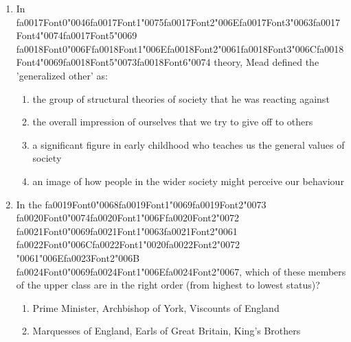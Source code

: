 \documentclass[12pt]{article}
\begin{document}
\begin{enumerate}[label=\arabic*.]
\begin{enumerate}[label=(\alph*)]
    \item an awareness of risks and dangers that affect the environment as a whole
    \item a unit with a division of labour that extends across ethnic and cultural groups
\end{enumerate}
\item In {\csname fa0017Font0\endcsname\char"0046}{\csname fa0017Font1\endcsname\char"0075}{\csname fa0017Font2\endcsname\char"006E}{\csname fa0017Font3\endcsname\char"0063}{\csname fa0017Font4\endcsname\char"0074}{\csname fa0017Font5\endcsname\char"0069} {\csname fa0018Font0\endcsname\char"006F}{\csname fa0018Font1\endcsname\char"006E}{\csname fa0018Font2\endcsname\char"0061}{\csname fa0018Font3\endcsname\char"006C}{\csname fa0018Font4\endcsname\char"0069}{\csname fa0018Font5\endcsname\char"0073}{\csname fa0018Font6\endcsname\char"0074} theory, Mead defined the 'generalized other' as:
\begin{enumerate}[label=(\alph*)]
    \item the group of structural theories of society that he was reacting against
    \item the overall impression of ourselves that we try to give off to others
    \item a significant figure in early childhood who teaches us the general values of society
    \item an image of how people in the wider society might perceive our behaviour
\end{enumerate}
\item In the {\csname fa0019Font0\endcsname\char"0068}{\csname fa0019Font1\endcsname\char"0069}{\csname fa0019Font2\endcsname\char"0073} {\csname fa0020Font0\endcsname\char"0074}{\csname fa0020Font1\endcsname\char"006F}{\csname fa0020Font2\endcsname\char"0072} {\csname fa0021Font0\endcsname\char"0069}{\csname fa0021Font1\endcsname\char"0063}{\csname fa0021Font2\endcsname\char"0061} {\csname fa0022Font0\endcsname\char"006C}{\csname fa0022Font1\endcsname\char"0020}{\csname fa0022Font2\endcsname\char"0072} {\char"0061}{\char"006E}{\csname fa0023Font2\endcsname\char"006B} {\csname fa0024Font0\endcsname\char"0069}{\csname fa0024Font1\endcsname\char"006E}{\csname fa0024Font2\endcsname\char"0067}, which of these members of the upper class are in the right order (from highest to lowest status)?
\begin{enumerate}[label=(\alph*)]
    \item Prime Minister, Archbishop of York, Viscounts of England
    \item Marquesses of England, Earls of Great Britain, King's Brothers

\end{enumerate}
\end{enumerate}
\end{document}

